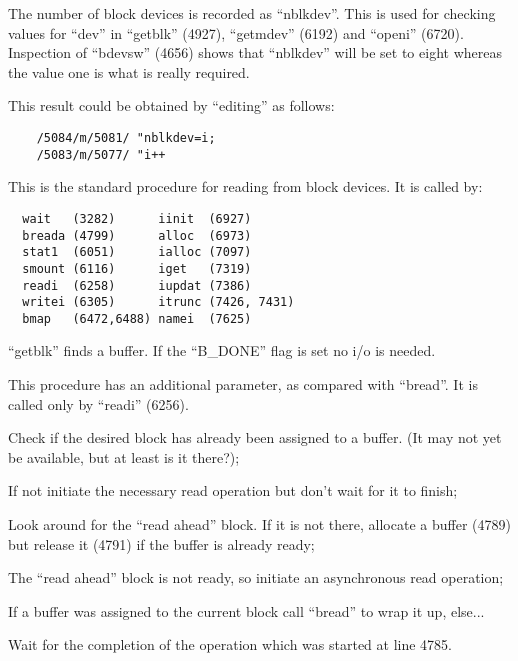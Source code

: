 The number of block devices is recorded
as ``nblkdev''. This is used for checking
values for ``dev'' in ``getblk'' (4927),
``getmdev'' (6192) and ``openi'' (6720).
Inspection of ``bdevsw'' (4656) shows
that ``nblkdev'' will be set to eight
whereas the value one is what is really
required.

This result could be obtained by ``editing'' as follows:

\begin{verbatim}
    /5084/m/5081/ "nblkdev=i;
    /5083/m/5077/ "i++
\end{verbatim}


This is the standard procedure for
reading from block devices. It is
called by:

\begin{verbatim}
  wait   (3282)      iinit  (6927)
  breada (4799)      alloc  (6973)
  stat1  (6051)      ialloc (7097)
  smount (6116)      iget   (7319)
  readi  (6258)      iupdat (7386)
  writei (6305)      itrunc (7426, 7431)
  bmap   (6472,6488) namei  (7625) 
\end{verbatim}

``getblk'' finds a buffer. If the
``B\_DONE'' flag is set no i/o is needed.


This procedure has an additional parameter, as compared with ``bread''. It is
called only by ``readi'' (6256).

\bd
\item[4780:] Check if the desired block has
 already been assigned to a
 buffer. (It may not yet be
 available, but at least is it
 there?);

\item[4781:] If not initiate the necessary
read operation but don't wait for
it to finish;

\item[4788:] Look around for the ``read ahead''
 block. If it is not there, allocate a buffer (4789) but release
 it (4791) if the buffer is
 already ready;

\item[4793:] The ``read ahead'' block is not
 ready, so initiate an asynchronous read operation;

\item[4798:] If a buffer was assigned to the
 current block call ``bread'' to
 wrap it up, else...

\item[4800:] Wait for the completion of the
 operation which was started at
 line 4785.
\ed


